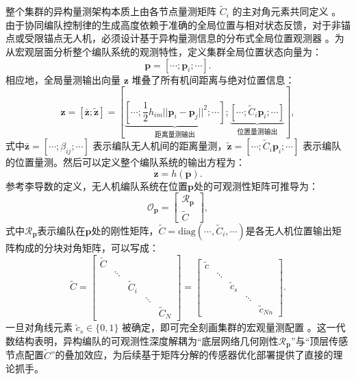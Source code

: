 整个集群的异构量测架构本质上由各节点量测矩阵 $\tilde{C}_i$ 的主对角元素共同定义 。由于协同编队控制律的生成高度依赖于准确的全局位置与相对状态反馈，对于非锚点或受限锚点无人机，必须设计基于异构量测信息的分布式全局位置观测器 。为从宏观层面分析整个编队系统的观测特性，定义集群全局位置状态向量为：
\begin{equation}
	{\mathbf{p}} = [\cdots;{\mathbf{p}}_i;\cdots].
\end{equation}
相应地，全局量测输出向量 $\mathbf{z}$ 堆叠了所有机间距离与绝对位置信息：
\begin{equation}
	\mathbf{z} = [\bar{\mathbf{z}};\tilde{\mathbf{z}}] = 
	\left[
		\underbrace{
			\left[
			\cdots; \frac{1}{2} h_{im} ||{\mathbf{p}}_i-{\mathbf{p}}_j||^2;\cdots
			\right]
		}_{\text{距离量测输出}};
		\underbrace{
			\left[
			\cdots ; 
			\tilde{C}_i \mathbf{p}_i ;
			\cdots 
			\right]
		}_{\text{位置量测输出}}
	\right],
\end{equation}
式中$ \bar{\mathbf{z}} = [\cdots; \beta_{ij}; \cdots] $ 表示编队无人机间的距离量测，$ \tilde{\mathbf{z}} = \left[\cdots; \tilde{C}_i \mathbf{p}_i ; \cdots \right]$ 表示编队的位置量测。然后可以定义整个编队系统的输出方程为：
\begin{equation}
	\mathbf{z} = h(\mathbf{p}).
	\label{编队系统输出方程}
\end{equation}
参考李导数的定义，无人机编队系统在位置$ \mathbf{p} $处的可观测性矩阵可推导为：
\begin{equation}
	\mathcal{O}_{\mathbf{p}} = 
	\begin{bmatrix}
		\mathcal{R}_{\mathbf{p}}  \\
		\tilde{C} 
	\end{bmatrix},
	\label{可观测性矩阵}
\end{equation}
式中$ \mathcal{R}_{\mathbf{p}}$表示编队在$ \mathbf{p} $处的刚性矩阵，$\tilde{C} = \text{diag}(\cdots, \tilde{C}_i, \cdots)$是各无人机位置输出矩阵构成的分块对角矩阵，可以写成：
\begin{equation}
	\tilde{C} = 
	\begin{bmatrix}
		\tilde{C}& & & & \\
		& \ddots & & & \\
		& & \tilde{C}_i & & \\
		& & & \ddots & \\
		& & & & \tilde{C}_N
	\end{bmatrix}
	=
	\begin{bmatrix}
		\tilde{c}& & & & \\
		& \ddots & & & \\
		& & \tilde{c}_s & & \\
		& & & \ddots & \\
		& & & & \tilde{c}_{Nn}
	\end{bmatrix}.
\end{equation}
一旦对角线元素 $\tilde{c}_s \in \{0,1\}$ 被确定，即可完全刻画集群的宏观量测配置 。这一代数结构表明，异构编队的可观测性深度解耦为“底层网络几何刚性$\mathcal{R}_{\mathbf{p}}$”与“顶层传感节点配置$\tilde{C}$”的叠加效应，为后续基于矩阵分解的传感器优化部署提供了直接的理论抓手。
